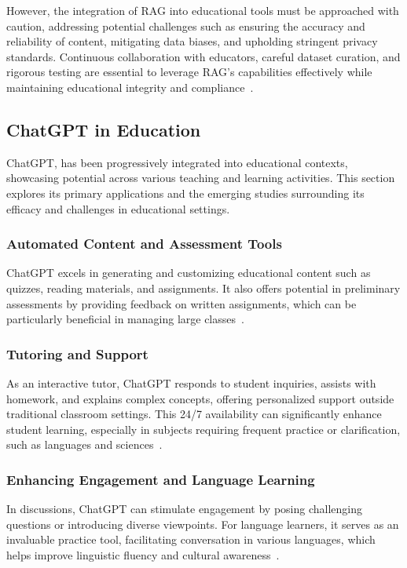 However, the integration of RAG into educational tools must be approached with caution, addressing potential challenges such as ensuring the accuracy and reliability of content, mitigating data biases, and upholding stringent privacy standards. Continuous collaboration with educators, careful dataset curation, and rigorous testing are essential to leverage RAG's capabilities effectively while maintaining educational integrity and compliance~\cite{holmes2019_artificial}.


\subsection{ChatGPT in Education}
\label{subsec:chatgpt_education}

ChatGPT, has been progressively integrated into educational contexts, showcasing potential across various teaching and learning activities. This section explores its primary applications and the emerging studies surrounding its efficacy and challenges in educational settings.

\subsubsection{Automated Content and Assessment Tools}
ChatGPT excels in generating and customizing educational content such as quizzes, reading materials, and assignments. It also offers potential in preliminary assessments by providing feedback on written assignments, which can be particularly beneficial in managing large classes~\cite{automated_content_generation}.

\subsubsection{Tutoring and Support}
As an interactive tutor, ChatGPT responds to student inquiries, assists with homework, and explains complex concepts, offering personalized support outside traditional classroom settings. This 24/7 availability can significantly enhance student learning, especially in subjects requiring frequent practice or clarification, such as languages and sciences~\cite{interactive_tutoring}.

\subsubsection{Enhancing Engagement and Language Learning}
In discussions, ChatGPT can stimulate engagement by posing challenging questions or introducing diverse viewpoints. For language learners, it serves as an invaluable practice tool, facilitating conversation in various languages, which helps improve linguistic fluency and cultural awareness~\cite{language_learning}.

